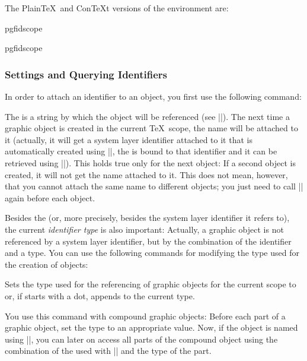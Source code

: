 The Plain\TeX\ and Con\TeX t versions of the environment are:
%
\begin{plainenvironment}{{pgfidscope}}
\end{plainenvironment}

\begin{contextenvironment}{{pgfidscope}}
\end{contextenvironment}


\subsubsection{Settings and Querying Identifiers}

In order to attach an identifier to an object, you first use the following
command:

\begin{command}{\pgfuseid{}}
    The  is a string by which the object will be referenced (see
    |\pgfidrefnextuse|). The next time a graphic object is created in the
    current \TeX\ scope, the name will be attached to it (actually, it will get
    a system layer identifier attached to it that is automatically created
    using |\pgfsys@new@id|, the  is bound to that identifier and it
    can be retrieved using |\pgfidrefnextuse|). This holds true only for the
    next object: If a second object is created, it will not get the name
    attached to it. This does not mean, however, that you cannot attach the
    same name to different objects; you just need to call |\pgfuseid| again
    before each object.

    Besides the  (or, more precisely, besides the system layer
    identifier it refers to), the current \emph{identifier type} is also
    important: Actually, a graphic object is not referenced by a system layer
    identifier, but by the combination of the identifier and a type. You can
    use the following commands for modifying the type used for the creation of
    objects:

    \begin{command}{\pgfusetype{}}
        Sets the type used for the referencing of graphic objects for the
        current scope to  or, if  starts with a dot,
        appends  to the current type.

        You use this command with compound graphic objects: Before each part of
        a graphic object, set the type to an appropriate value. Now, if the
        object is named using |\pgfuseid|, you can later on access all parts of
        the compound object using the combination of the  used with
        |\pgfuseid| and the type of the part.


\end{command}
\end{command}
